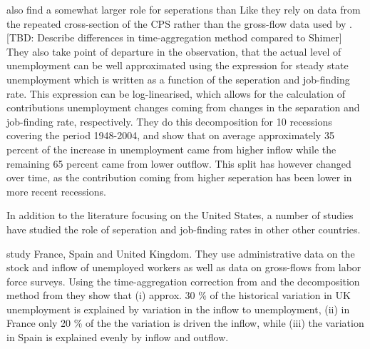 \cite{Elsby2009b} also find a somewhat larger role for seperations than \cite{Shimer2012} Like \cite{Shimer2005} they rely on data from the repeated cross-section of the CPS rather than the gross-flow data used by \cite{Fujita2008}. [TBD: Describe differences in time-aggregation method compared to Shimer] They also take point of departure in the observation, that the actual level of unemployment can be well approximated using the expression for steady state unemployment which is written as a function of the seperation and job-finding rate. This expression can be log-linearised, which allows for the calculation of contributions unemployment changes coming from changes in the separation and job-finding rate, respectively. They do this decomposition for 10 recessions covering the period 1948-2004, and show that on average approximately 35 percent of the increase in unemployment came from higher inflow while the remaining 65 percent came from lower outflow. This split has however changed over time, as the contribution coming from higher seperation has been lower in more recent recessions. 

\cite{Yashiv2007}

In addition to the literature focusing on the United States, a number of studies have studied the role of seperation and job-finding rates in other other countries. 

\cite{Petrongolo2008} study France, Spain and United Kingdom. They use administrative data on the stock and inflow of unemployed workers as well as data on gross-flows from labor force surveys. Using the time-aggregation correction from \cite{Shimer2012} and the decomposition method from \cite{Fujita2009} they show that (i) approx. 30 \% of the historical variation in UK unemployment is explained by variation in the inflow to unemployment, (ii) in France only 20 \% of the the variation is driven the inflow, while (iii) the variation in Spain is explained evenly by inflow and outflow.  

